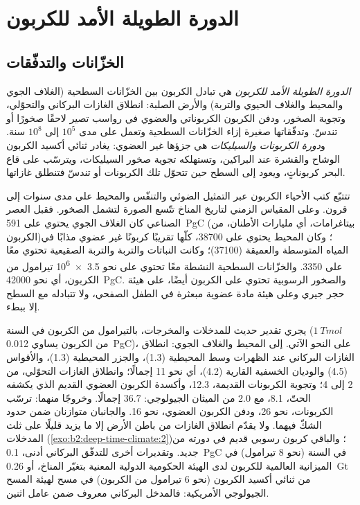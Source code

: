 \section{الدورة الطويلة الأمد للكربون}\label{sec:b2:deep-time-climate:cycle}

\subsection*{الخزّانات والتدفّقات}

\begin{definition}\label{def:b2:deep-time-climate:carbon-cycle}
\emph{الدورة الطويلة الأمد للكربون} هي تبادل الكربون بين
الخزّانات السطحية (الغلاف الجوي والمحيط والغلاف الحيوي والتربة) والأرض الصلبة: انطلاق الغازات البركاني
والتحوّلي، وتجوية الصخور، ودفن الكربون الكربوناتي والعضوي في
رواسب تصير لاحقًا صخورًا أو تندسّ. وتدفّقاتها صغيرة إزاء الخزّانات
السطحية وتعمل على مدى $10^5$ إلى $10^8$ سنة. و\emph{دورة الكربونات
والسيليكات} هي جزؤها غير العضوي: يغادر ثنائي أكسيد الكربون الوشاح
والقشرة عند البراكين، وتستهلكه تجوية صخور السيليكات، ويترسّب على
قاع البحر كربوناتٍ، ويعود إلى السطح حين تتحوّل تلك الكربونات أو
تندسّ فتنطلق غازاتها.
\end{definition}

تتتبّع كتب الأحياء الكربون عبر التمثيل الضوئي والتنفّس والمحيط على مدى سنوات إلى
قرون. وعلى المقياس الزمني لتاريخ المناخ تتّسع الصورة لتشمل الصخور. فقبل
العصر الصناعي كان الغلاف الجوي يحتوي على \qty{591}{PgC} (بيتاغرامات، أي مليارات الأطنان، من الكربون)؛
وكان المحيط يحتوي على \num{38700}، كلّها تقريبًا كربونًا غير عضوي مذابًا في المياه المتوسطة
والعميقة (\num{37100})؛ وكانت النباتات والتربة والتربة الصقيعية تحتوي معًا على \num{3350}.
والخزّانات السطحية النشطة معًا تحتوي على نحو \num{3.5e6} تيرامول من الكربون، أي نحو
\qty{42000}{PgC}. والصخور الرسوبية تحتوي على الكربون أيضًا، على هيئة حجر جيري وعلى هيئة مادة عضوية
مبعثرة في الطفل الصفحي، ولا تتبادله مع السطح إلا ببطء.

يجري تقدير حديث للمدخلات والمخرجات، بالتيرامول من الكربون في السنة ($\qty{1}{Tmol}$ من
الكربون يساوي \qty{0.012}{PgC})، على النحو الآتي. إلى المحيط والغلاف الجوي: انطلاق الغازات البركاني عند
الظهرات وسط المحيطية (1.3)، والجزر المحيطية (1.3)، والأقواس (4.5) والوديان الخسفية القارية (4.2)، أي نحو 11
إجمالًا؛ وانطلاق الغازات التحوّلي، من 2 إلى 4؛ وتجوية الكربونات القديمة، 12.3، وأكسدة
الكربون العضوي القديم الذي يكشفه الحتّ، 8.1، مع 2.0 من الميثان الجيولوجي: \num{36.7} إجمالًا.
وخروجًا منهما: ترسّب الكربونات، نحو 26، ودفن الكربون العضوي، نحو 16. والجانبان
متوازنان ضمن حدود الشكّ فيهما. ولا يقدّم انطلاق الغازات من باطن الأرض إلا ما يزيد قليلًا على
ثلث المدخلات (\cref{exo:b2:deep-time-climate:2})؛ والباقي كربون رسوبي قديم في
دورته من جديد. وتقديرات أخرى للتدفّق البركاني أدنى، \qty{0.1}{PgC} في السنة
(نحو 8 تيرامول) في الميزانية العالمية للكربون لدى الهيئة الحكومية الدولية المعنية بتغيّر المناخ، أو \qty{0.26}{Gt} من ثنائي أكسيد الكربون (نحو 6
تيرامول من الكربون) في مسح لهيئة المسح الجيولوجي الأمريكية: فالمدخل البركاني معروف ضمن
عامل اثنين.

